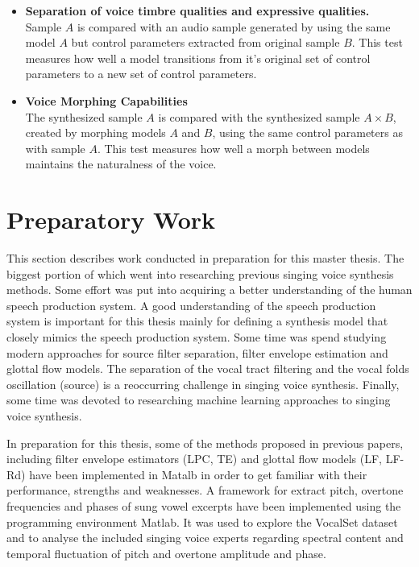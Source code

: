 \documentclass{article}
\begin{document}
\begin{itemize}
    \item \textbf{Separation of voice timbre qualities and expressive qualities.}\\
    Sample $A$ is compared with an audio sample generated by using the same model $A$ but control parameters extracted from original sample $B$. This test measures how well a model transitions from it's original set of control parameters to a new set of control parameters.  
    \item \textbf{Voice Morphing Capabilities}\\
    The synthesized sample $A$ is compared with the synthesized sample $A \times B$, created by morphing models $A$ and $B$, using the same control parameters as with sample $A$. This test measures how well a morph between models maintains the naturalness of the voice.
\end{itemize}

\section{Preparatory Work}

This section describes work conducted in preparation for this master thesis. The biggest portion of which went into researching previous singing voice synthesis methods. Some effort was put into acquiring a better understanding of the human speech production system. A good understanding of the speech production system is important for this thesis mainly for defining a synthesis model that closely mimics the speech production system. Some time was spend studying modern approaches for source filter separation, filter envelope estimation and glottal flow models. The separation of the vocal tract filtering and the vocal folds oscillation (source) is a reoccurring challenge in singing voice synthesis. Finally, some time was devoted to researching machine learning approaches to singing voice synthesis.

In preparation for this thesis, some of the methods proposed in previous papers, including filter envelope estimators (LPC, TE) and glottal flow models (LF, LF-Rd) have been implemented in Matalb in order to get familiar with their performance, strengths and weaknesses. A framework for extract pitch, overtone frequencies and phases of sung vowel excerpts have been implemented using the programming environment Matlab. It was used to explore the VocalSet dataset\cite{wilkins_vocalset:_2018} and to analyse the included singing voice experts regarding spectral content and temporal fluctuation of pitch and overtone amplitude and phase. 
\end{document}
